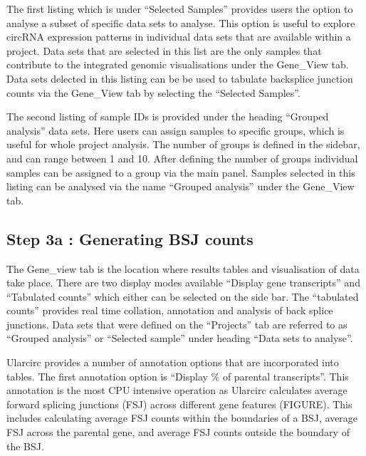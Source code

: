 \documentclass[12pt]{article}
\begin{document}
The first listing which is under ``Selected Samples'' provides users the option to analyse a subset of specific data sets to analyse. This option is useful to explore circRNA expression patterns in individual data sets that are available within a project. Data sets that are selected in this list are the only samples that contribute to the integrated genomic visualisations under the Gene\_View tab. Data sets delected in this listing can be be used to tabulate backsplice junction counts via the Gene\_View tab by selecting the ``Selected Samples''. \par

The second listing of sample IDs is provided under the heading ``Grouped analysis'' data sets. Here users can assign samples to specific groups, which is useful for whole project analysis. The number of groups is defined in the sidebar, and can range between 1 and 10. After defining the number of groups individual samples can be assigned to a group via the main panel. Samples selected in this listing can be analysed via the name ``Grouped analysis'' under the Gene\_View tab.


\subsection{Step 3a : Generating BSJ counts} \label{sec:Step3a}

\indent The Gene\_view tab is the location where results tables and visualisation of data take place. There are two display modes available ``Display gene transcripts'' and ``Tabulated counts'' which either can be selected on the side bar. The ``tabulated counts'' provides real time collation, annotation and analysis of back splice junctions. Data sets that were defined on the ``Projects'' tab are referred to as ``Grouped analysis'' or ``Selected sample'' under heading ``Data sets to analyse''. \par

Ularcirc provides a number of annotation options that are incorporated into tables. The first annotation option is ``Display \% of parental transcripts''. This annotation is the most CPU intensive operation as Ularcirc calculates average forward splicing junctions (FSJ) across different gene features (FIGURE). This includes calculating average FSJ counts within the boundaries of a BSJ, average FSJ across the parental gene, and average FSJ counts outside the boundary of the BSJ. \par
\end{document}
